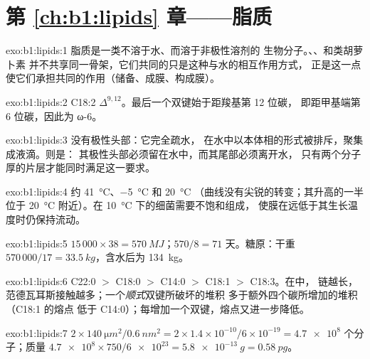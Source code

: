 \section*{第 \ref{ch:b1:lipids} 章——脂质}

\begin{solution}{exo:b1:lipids:1}
脂质是一类不溶于水、而溶于非极性溶剂的
生物分子。、、和类胡萝卜素
并不共享同一骨架，它们共同的只是这种与水的相互作用方式，
正是这一点使它们承担共同的作用（储备、成膜、构成膜）。
\end{solution}

\begin{solution}{exo:b1:lipids:2}
C18:2 $\Delta^{9,12}$。最后一个双键始于距羧基第 12 位碳，
即距甲基端第 6 位碳，因此为 ω-6。
\end{solution}

\begin{solution}{exo:b1:lipids:3}
没有极性头部：它完全疏水，
在水中以本体相的形式被排斥，聚集成液滴。则是：
其极性头部必须留在水中，而其尾部必须离开水，
只有两个分子厚的片层才能同时满足这一要求。
\end{solution}

\begin{solution}{exo:b1:lipids:4}
约 \qty{41}{\celsius}、\qty{-5}{\celsius} 和 \qty{20}{\celsius}
（曲线没有尖锐的转变；其升高的一半位于
\qty{20}{\celsius} 附近）。在 \qty{10}{\celsius} 下的细菌需要不饱和组成，
使膜在远低于其生长温度时仍保持流动。
\end{solution}

\begin{solution}{exo:b1:lipids:5}
$15\,000\times 38 = \qty{570}{MJ}$；$570/8 = 71$ 天。糖原：干重
$570\,000/17 = \qty{33.5}{kg}$，含水后为 \qty{134}{kg}。
\end{solution}

\begin{solution}{exo:b1:lipids:6}
C22:0 $>$ C18:0 $>$ C14:0 $>$ C18:1 $>$ C18:3。在中，
链越长，范德瓦耳斯接触越多；一个\emph{顺式}双键所破坏的堆积
多于额外四个碳所增加的堆积（C18:1 的熔点
低于 C14:0）；每增加一个双键，熔点又进一步降低。
\end{solution}

\begin{solution}{exo:b1:lipids:7}
$2\times\qty{140}{\micro m^2}/\qty{0.6}{nm^2} = 2\times 1.4\times
10^{-10}/6\times 10^{-19} = \num{4.7e8}$ 个分子；质量
$\num{4.7e8}\times 750/\num{6e23} = \qty{5.8e-13}{g} = \qty{0.58}{pg}$。
\end{solution}

